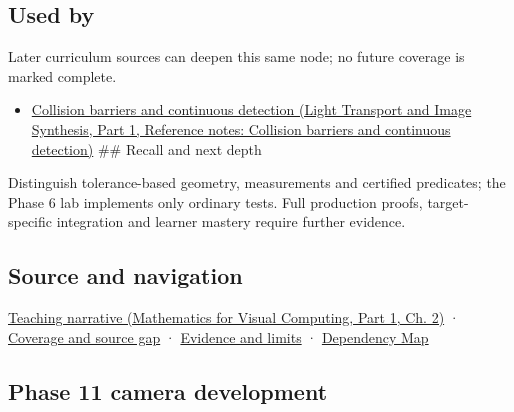 \subsection{Used by}\label{appendix-341296fb3f64-used-by}

\hypertarget{appendix-341296fb3f64-used-by}{}

Later curriculum sources can deepen this same node; no future coverage is marked complete.

\begin{itemize}
\tightlist
\item
  \href{../04-Light-Transport-and-Image-Synthesis-P01/main.pdf\#nameddest=appendix-a9ba01fa72a6}{Collision barriers and continuous detection (Light Transport and Image Synthesis, Part 1, Reference notes: Collision barriers and continuous detection)} \#\# Recall and next depth
\end{itemize}

Distinguish tolerance-based geometry, measurements and certified predicates; the Phase 6 lab implements only ordinary tests. Full production proofs, target-specific integration and learner mastery require further evidence.

\subsection{Source and navigation}\label{appendix-341296fb3f64-source-and-navigation}

\hypertarget{appendix-341296fb3f64-source-and-navigation}{}

\href{../02-Mathematics-for-Visual-Computing-P01/main.pdf\#nameddest=01-foundations-i-ch018-the-sensor-needs-coordinates-inside-the-triangle}{Teaching narrative (Mathematics for Visual Computing, Part 1, Ch. 2)} · \hyperref[appendix-fd090d982a15-phase-6---parts-501-600]{Coverage and source gap} · \hyperref[appendix-a103e7846d21-phase-6---source-analysis-and-verification]{Evidence and limits} · \hyperref[appendix-4ad47bdd269a]{Dependency Map}

\subsection{Phase 11 camera development}\label{appendix-341296fb3f64-phase-11-camera-development}

\hypertarget{appendix-341296fb3f64-phase-11-camera-development}{}

